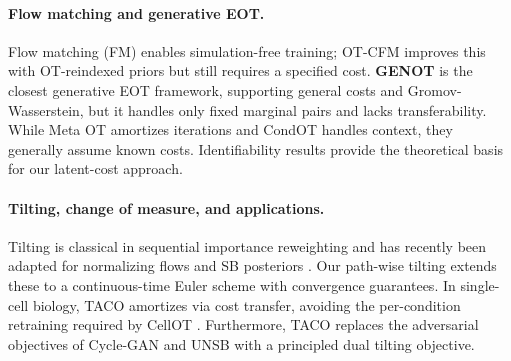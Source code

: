\documentclass[11pt]{article}
\theoremstyle{definition}
\numberwithin{equation}{section}%
\begin{document}
\paragraph{Flow matching and generative EOT.}
Flow matching (FM) \citep{lipman2022flow,liu2022flow,albergo2022building} enables simulation-free training; OT-CFM \citep{tong2023improving} improves this with OT-reindexed priors but still requires a specified cost. \textbf{GENOT} \citep{klein2024genot} is the closest generative EOT framework, supporting general costs and Gromov-Wasserstein, but it handles only fixed marginal pairs and lacks transferability. While Meta OT \citep{amos2023meta} amortizes iterations and CondOT \citep{bunne2022condot} handles context, they generally assume known costs. Identifiability results \citep{gonzalez2024identifiability} provide the theoretical basis for our latent-cost approach.

\paragraph{Tilting, change of measure, and applications.}
Tilting is classical in sequential importance reweighting \citep{moral2004feynman} and has recently been adapted for normalizing flows \citep{potaptchik2025tilt} and SB posteriors \citep{pachebat2025iterative}. Our path-wise tilting extends these to a continuous-time Euler scheme with convergence guarantees. In single-cell biology, TACO amortizes via cost transfer, avoiding the per-condition retraining required by CellOT \citep{bunne2022supervised}. Furthermore, TACO replaces the adversarial objectives of Cycle-GAN \citep{zhu2017unpaired} and UNSB \citep{kim2022maximum} with a principled dual tilting objective.



\end{document}
